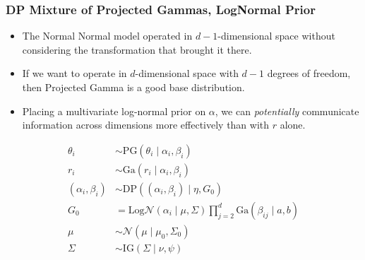 \documentclass[aspectratio=169]{beamer}
\begin{document}
\begin{frame}
  \frametitle{DP Mixture of Projected Gammas, LogNormal Prior}
  \begin{itemize}
    \item The Normal Normal model operated in $d-1$-dimensional space without considering the transformation
      that brought it there.
    \item If we want to operate in $d$-dimensional space with $d-1$ degrees of freedom, then Projected Gamma
      is a good base distribution.
    \item Placing a multivariate log-normal prior on $\alpha$, we can \emph{potentially} communicate information
      across dimensions more effectively than with $r$ alone.
  \end{itemize}
  \begin{equation*}
    \begin{aligned}
      \theta_i &\sim \text{PG}(\theta_i\mid \alpha_i,\beta_i)\\
      r_i &\sim \text{Ga}(r_i\mid \alpha_i,\beta_i)\\
      (\alpha_i,\beta_i) &\sim \text{DP}\left((\alpha_i,\beta_i)\mid \eta, G_0\right)\\
      G_0 &= \text{Log}\mathcal{N}(\alpha_i\mid\mu,\Sigma)\prod_{j = 2}^d\text{Ga}(\beta_{ij}\mid a, b)\\
      \mu &\sim \mathcal{N}(\mu\mid\mu_0,\Sigma_0)\\
      \Sigma &\sim \text{IG}(\Sigma\mid\nu,\psi)
    \end{aligned}
  \end{equation*}
\end{frame}
\end{document}

